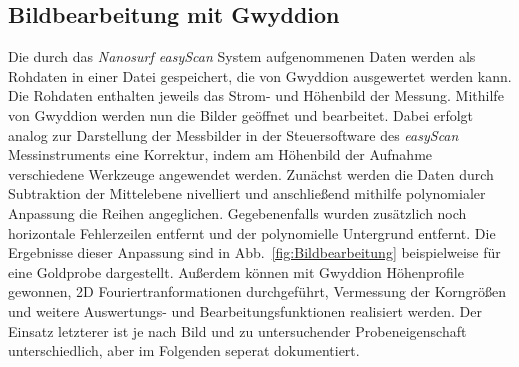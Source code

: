 \documentclass[a4paper,twoside,final]{article}
\begin{document}
\subsection{Bildbearbeitung mit Gwyddion}
Die durch das \textit{Nanosurf easyScan} System aufgenommenen Daten werden als Rohdaten in einer Datei gespeichert, die von Gwyddion ausgewertet werden kann. Die Rohdaten enthalten jeweils das Strom- und Höhenbild der Messung. Mithilfe von Gwyddion werden nun die Bilder geöffnet und bearbeitet. Dabei erfolgt analog zur Darstellung der Messbilder in der Steuersoftware des \textit{easyScan} Messinstruments eine Korrektur, indem am Höhenbild der Aufnahme verschiedene Werkzeuge angewendet werden. Zunächst werden die Daten durch Subtraktion der Mittelebene nivelliert und anschließend mithilfe polynomialer Anpassung die Reihen angeglichen. Gegebenenfalls wurden zusätzlich noch horizontale Fehlerzeilen entfernt und der polynomielle Untergrund entfernt. Die Ergebnisse dieser Anpassung sind in Abb.~\ref{fig:Bildbearbeitung} beispielweise für eine Goldprobe dargestellt. Außerdem können mit Gwyddion Höhenprofile gewonnen, 2D Fouriertranformationen durchgeführt, Vermessung der Korngrößen und weitere Auswertungs- und Bearbeitungsfunktionen realisiert werden. Der Einsatz letzterer ist je nach Bild und zu untersuchender Probeneigenschaft unterschiedlich, aber im Folgenden seperat dokumentiert.
\end{document}
